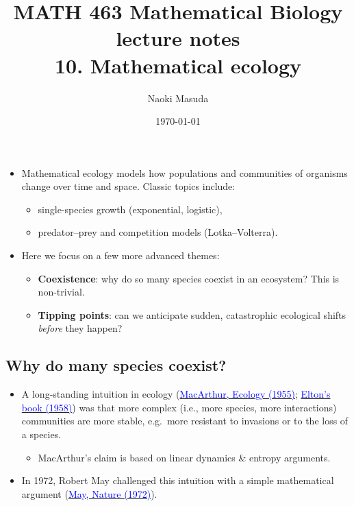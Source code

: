 \documentclass[20pt]{extarticle}
\newcommand{\hrefc}[2]{\href{#1}{\textcolor{blue}{#2}}}
\begin{document}
\title{MATH 463 Mathematical Biology\\ lecture notes\\
10. Mathematical ecology}
\date{\today}
\author{Naoki Masuda}

\maketitle

\begin{itemize}
\item Mathematical ecology models how populations and communities of organisms change over time and space. Classic topics include:
	\begin{itemize}
	\item single-species growth (exponential, logistic),
	\item predator--prey and competition models (Lotka--Volterra).
	\end{itemize}
\item Here we focus on a few more advanced themes:
	\begin{itemize}
	\item \textbf{Coexistence}: why do so many species coexist in an ecosystem? This is non-trivial.
	\item \textbf{Tipping points}: can we anticipate sudden, catastrophic ecological shifts \emph{before} they happen?
	\end{itemize}
\end{itemize}

\subsection*{Why do many species coexist?}

\begin{itemize}
\item A long-standing intuition in ecology (\hrefc{https://doi.org/10.2307/1929601}{MacArthur, Ecology (1955)}; \hrefc{https://doi.org/10.1007/978-1-4899-7214-9}{Elton's book (1958)}) was that more complex (i.e., more species, more interactions) communities are more stable, e.g.\ more resistant to invasions or to the loss of a species.
	\begin{itemize}
	\item MacArthur's claim is based on linear dynamics \& entropy arguments.
	\end{itemize}
\item In 1972, Robert May challenged this intuition with a simple mathematical argument (\hrefc{https://doi.org/10.1038/238413a0}{May, Nature (1972)}).
\end{itemize}
\end{document}
